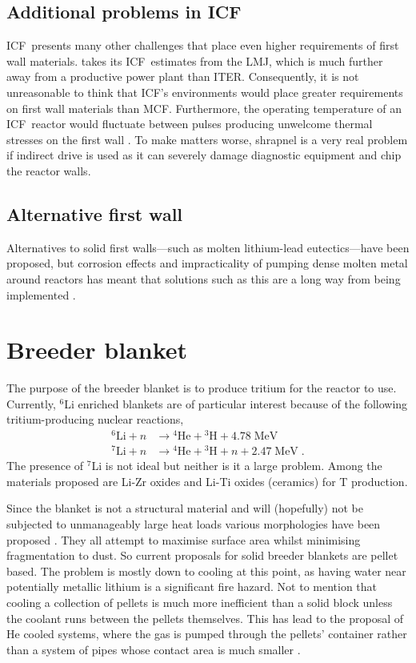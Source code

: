 \documentclass[12pt, a4paper]{article}
\newcommand{\mc}{MCF}
\newcommand{\ic}{ICF}
\newcommand{\ite}{ITER}
\begin{document}
		\subsection{Additional problems in \ic}
			\ic~presents many other challenges that place even higher requirements of first wall materials.  takes its \ic~estimates from the LMJ, which is much further away from a productive power plant than \ite. Consequently, it is not unreasonable to think that \ic's environments would place greater requirements on first wall materials than \mc. Furthermore, the operating temperature of an \ic~reactor would fluctuate between pulses producing unwelcome thermal stresses on the first wall \cite{ict1}. To make matters worse, shrapnel is a very real problem if indirect drive is used as it can severely damage diagnostic equipment and chip the reactor walls.
		\subsection{Alternative first wall}
			Alternatives to solid first walls---such as molten lithium-lead eutectics---have been proposed, but corrosion effects and impracticality of pumping dense molten metal around reactors has meant that solutions such as this are a long way from being implemented \cite{lfw1, lfw2, lfw3}.
	\section{Breeder blanket}\label{s:bb}
		The purpose of the breeder blanket is to produce tritium for the reactor to use. Currently, $^{6}$Li enriched blankets are of particular interest because of the following tritium-producing nuclear reactions,
		\begin{align}
			\textrm{$^{6}$Li} + n &\to \textrm{$^{4}$He} + \textrm{$^{3}$H} + 4.78\; \textrm{MeV} \\
			\textrm{$^{7}$Li} + n &\to \textrm{$^{4}$He} + \textrm{$^{3}$H} + n + 2.47\; \textrm{MeV}\; .
		\end{align}
		The presence of $^{7}$Li is not ideal but neither is it a large problem. Among the materials proposed are Li-Zr oxides and Li-Ti oxides (ceramics) for T production.
		
		Since the blanket is not a structural material and will (hopefully) not be subjected to unmanageably large heat loads various morphologies have been proposed \cite{bb1, bb2, bb3}. They all attempt to maximise surface area whilst minimising fragmentation to dust. So current proposals for solid breeder blankets are pellet based. The problem is mostly down to cooling at this point, as having water near potentially metallic lithium is a significant fire hazard. Not to mention that cooling a collection of pellets is much more inefficient than a solid block unless the coolant runs between the pellets themselves. This has lead to the proposal of He cooled systems, where the gas is pumped through the pellets' container rather than a system of pipes whose contact area is much smaller \cite{bb4}.
		
\end{document}
